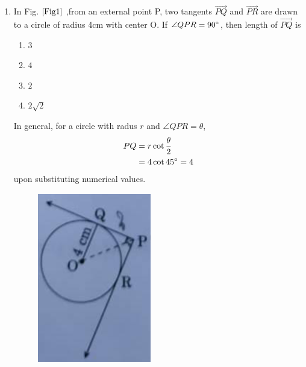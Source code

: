 \documentclass[journal,12pt,twocolumn]{IEEEtran}
\begin{document}
\begin{enumerate}[label=1.\arabic*]
\item In Fig. $\ref{Fig1}$ ,from an external point P, two tangents $\Vec{PQ}$ and $\Vec{PR}$ are drawn to a circle of radius 4cm with center O. If $\angle{QPR} = 90\degree$, then length of $\Vec{PQ}$ is
\begin{enumerate}
    \item $3$
    \item $4$
    \item $2$
    \item $2\sqrt{2}$
\end{enumerate}
\solution In general, for a circle with radus $r$ and $\angle{QPR} = \theta$, 
\begin{align}
	PQ &= r \cot \frac{\theta}{2}
	\\
	&= 4 \cot 45 \degree = 4
\end{align}
upon substituting numerical values.
\begin{figure}[h!]
    \centering
    \includegraphics[width=0.5\columnwidth]{Fig1.png}
	\caption{}
	\label{Fig1}
 \end{figure}
 

\end{enumerate}
\end{document}
